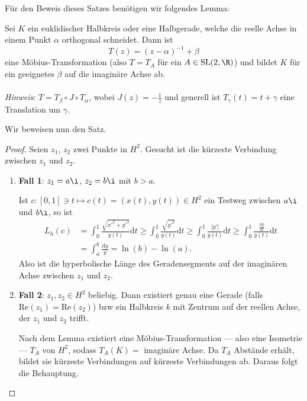 Für den Beweis dieses Satzes benötigen wir folgendes Lemma:

\begin{lemma}
  Sei \( K \) ein euklidischer Halbkreis oder eine Halbgerade, welche die reelle Achse in einem Punkt \( \alpha \) orthogonal schneidet. Dann ist
  \begin{equation*}
    T(z) = (z - \alpha)^{-1} + \beta
  \end{equation*}
  eine Möbius-Transformation (also \( T = T_A \) für ein \( A \in \text{SL}(2,\R) \)) und bildet \( K \) für ein geeignetes \( \beta \) auf die imaginäre Achse ab. \\
  \ \\
  \emph{Hinweis}: \( T = T_\beta \circ J \circ T_\alpha \), wobei \( J(z) = -\frac{1}{z} \) und generell ist \( T_\gamma(t) = t + \gamma \) eine Translation um \( \gamma \).
\end{lemma}

Wir beweisen nun den Satz.

\begin{proof}
  Seien \( z_1 \), \( z_2 \) zwei Punkte in \( H^2 \). Gesucht ist die kürzeste Verbindung zwischen \( z_1 \) und \( z_2 \).
  \begin{enumerate}
    \item \textbf{Fall 1}: \( z_1 = a\i \), \( z_2 = b\i \) mit \( b > a \).

    Ist \( c : [0,1] \ni t \mapsto c(t) = (x(t), y(t)) \in H^2 \) ein Testweg zwischen \( a\i \) und \( b\i \), so ist
    \begin{align*}
      L_h(c) &= \int_0^1 \frac{\sqrt{x'^2 + y'^2}}{y(t)}\text{d}t \geq \int_0^1 \frac{\sqrt{y'^2}}{y(t)}\text{d}t \geq \int_0^1 \frac{\left\vert y' \right\vert}{y(t)}\text{d}t \geq \int_0^1 \frac{\frac{\text{d}y}{\text{d}t}}{y(t)}\text{d}t \\
       &= \int_a^b \frac{\text{d}y}{y} = \ln(b) - \ln(a)\text{.}
    \end{align*}
    Also ist die hyperbolische Länge des Geradensegments auf der imaginären Achse zwischen \( z_1 \) und \( z_2 \).

    \item \textbf{Fall 2}: \( z_1, z_2 \in H^2 \) beliebig. Dann existiert genau eine Gerade (falls \( \text{Re}(z_1) = \text{Re}(z_2) \)) bzw ein Halbkreis \( k \) mit Zentrum auf der reellen Achse, der \( z_1 \) und \( z_2 \) trifft.

    Nach dem Lemma existiert eine Möbius-Transformation --- also eine Isometrie --- \( T_A \) von \( H^2 \), sodass \( T_A(K) = \) imaginäre Achse. Da \( T_A \) Abstände erhält, bildet sie kürzeste Verbindungen auf kürzeste Verbindungen ab. Daraus folgt die Behauptung.
  \end{enumerate}
\end{proof}


